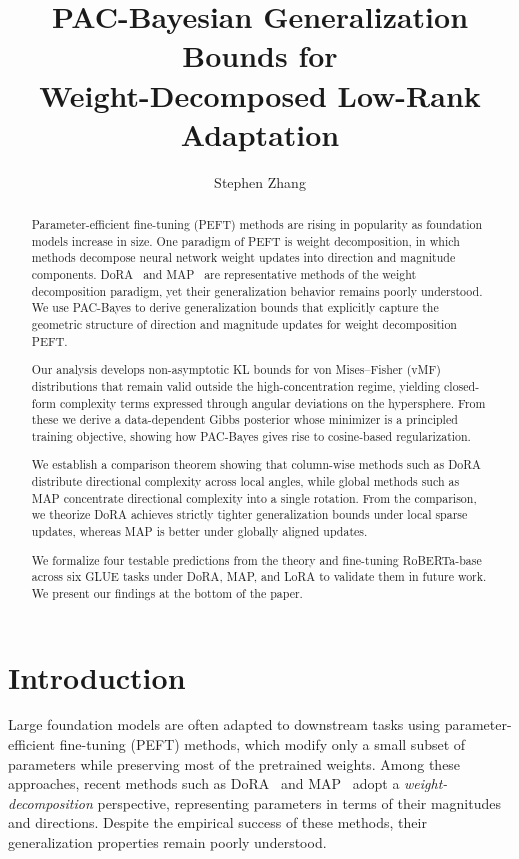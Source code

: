 \documentclass[11pt]{article}
\title{\textbf{PAC-Bayesian Generalization Bounds for\\
Weight-Decomposed Low-Rank Adaptation}}
\author{Stephen Zhang}
\date{}
\begin{document}
\maketitle

\begin{abstract}
Parameter-efficient fine-tuning (PEFT) methods are rising in popularity as foundation models increase in size. One paradigm of PEFT is weight decomposition, in which methods decompose neural network weight updates into direction and magnitude components. DoRA~\cite{liu2024dora} and MAP~\cite{si2025map} are representative methods of the weight decomposition paradigm, yet their generalization behavior remains poorly understood. We use PAC-Bayes to derive generalization bounds that explicitly capture the geometric structure of direction and magnitude updates for weight decomposition PEFT.

Our analysis develops non-asymptotic KL bounds for von Mises–Fisher (vMF) distributions that remain valid outside the high-concentration regime, yielding closed-form complexity terms expressed through angular deviations on the hypersphere. From these we derive a data-dependent Gibbs posterior whose minimizer is a principled training objective, showing how PAC-Bayes gives rise to cosine-based regularization.

We establish a comparison theorem showing that column-wise methods
such as DoRA distribute directional complexity across local angles, while
global methods such as MAP concentrate directional complexity into a single rotation. From the comparison, we theorize DoRA achieves strictly tighter generalization bounds under local sparse updates, whereas MAP is
better under globally aligned updates.

We formalize four testable predictions from the theory and fine-tuning RoBERTa-base across six GLUE tasks under DoRA, MAP, and LoRA to validate them in
future work. We present our findings at the bottom of the paper. 
\end{abstract}

\section{Introduction}

Large foundation models are often adapted to downstream tasks using
parameter-efficient fine-tuning (PEFT) methods, which modify only a small
subset of parameters while preserving most of the pretrained weights.
Among these approaches, recent methods such as DoRA~\cite{liu2024dora} and
MAP~\cite{si2025map} adopt a \emph{weight-decomposition} perspective,
representing parameters in terms of their magnitudes and directions.
Despite the empirical success of these methods, their generalization properties remain poorly understood.
\end{document}
